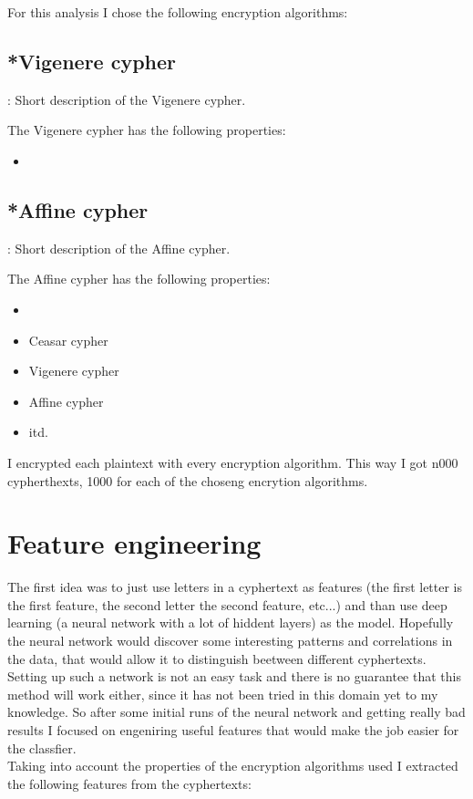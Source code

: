 \documentclass[a4paper]{article}
\begin{document}
For this analysis I chose the following encryption algorithms:

\subsection{*Vigenere cypher}
\TODO: Short description of the Vigenere cypher.

The Vigenere cypher has the following properties:

\begin{itemize}
	\item 
\end{itemize}

\subsection{*Affine cypher}
\TODO: Short description of the Affine cypher.

The Affine cypher has the following properties:

\begin{itemize}
	\item 
\end{itemize}


\begin{itemize}
	\item Ceasar cypher
	\item Vigenere cypher
	\item Affine cypher
	\item itd.
\end{itemize}

I encrypted each plaintext with every encryption algorithm. This way I got n000 cypherthexts, 1000 for each of the choseng encrytion algorithms.

\section*{Feature engineering}
The first idea was to just use letters in a cyphertext as features (the first letter is the first feature, the second letter the second feature, etc...) and than use deep learning (a neural network with a lot of hiddent layers) as the model. Hopefully the neural network would discover some interesting patterns and correlations in the data, that would allow it to distinguish beetween different cyphertexts. Setting up such a network is not an easy task and there is no guarantee that this method will work either, since it has not been tried in this domain yet to my knowledge. So after some initial runs of the neural network and getting really bad results I focused on engeniring useful features that would make the job easier for the classfier. \\
Taking into account the properties of the encryption algorithms used I extracted the following features from the cyphertexts:
\end{document}

